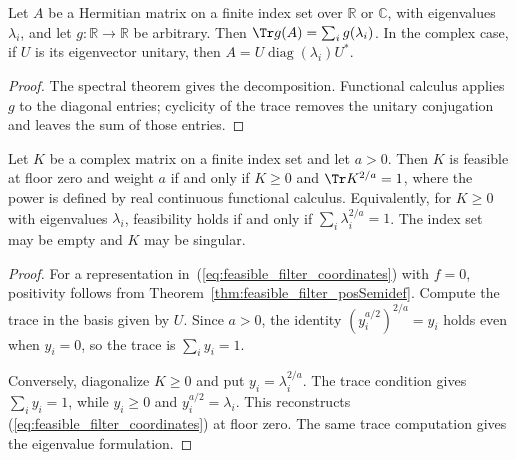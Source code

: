 \begin{theorem}
    \label{thm:hermitian_spectral_trace}
    \leanok
    Let $A$ be a Hermitian matrix on a finite index set over $\mathbb R$
    or $\mathbb C$, with eigenvalues $\lambda_i$, and let
    $g:\mathbb R\to\mathbb R$ be arbitrary. Then
    $\Tr g(A)=\sum_i g(\lambda_i)$. In the complex case, if $U$ is
    its eigenvector unitary, then
    $A=U\operatorname{diag}(\lambda_i)U^*$.
\end{theorem}
\begin{proof}
    \leanok
    The spectral theorem gives the decomposition. Functional calculus
    applies $g$ to the diagonal entries; cyclicity of the trace removes
    the unitary conjugation and leaves the sum of those entries.
\end{proof}

\begin{theorem}
    \label{thm:feasible_filter_trace_normalization}
    \leanok
    Let $K$ be a complex matrix on a finite index set and let $a>0$.
    Then $K$ is feasible at floor zero and weight $a$ if and only if
    $K\ge0$ and $\Tr K^{2/a}=1$, where the power is defined by real
    continuous functional calculus. Equivalently, for $K\ge0$ with
    eigenvalues $\lambda_i$, feasibility holds if and only if
    $\sum_i\lambda_i^{2/a}=1$. The index set may be empty and $K$ may
    be singular.
\end{theorem}
\begin{proof}
    \leanok
    For a representation in~(\ref{eq:feasible_filter_coordinates}) with
    $f=0$, positivity follows from
    Theorem~\ref{thm:feasible_filter_posSemidef}. Compute the trace in
    the basis given by $U$. Since $a>0$, the identity
    $(y_i^{a/2})^{2/a}=y_i$ holds even when $y_i=0$, so the trace is
    $\sum_i y_i=1$.

    Conversely, diagonalize $K\ge0$ and put $y_i=\lambda_i^{2/a}$.
    The trace condition gives $\sum_i y_i=1$, while $y_i\ge0$ and
    $y_i^{a/2}=\lambda_i$. This reconstructs
    (\ref{eq:feasible_filter_coordinates}) at floor zero. The same
    trace computation gives the eigenvalue formulation.
\end{proof}

